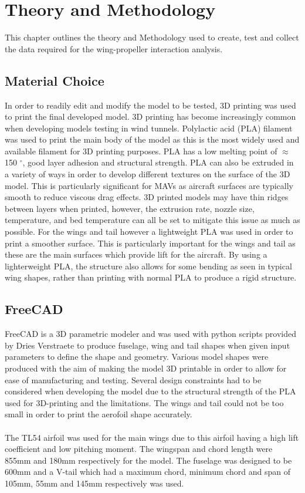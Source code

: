 \graphicspath{{./Figs/}}

\chapter{Theory and Methodology}
This chapter outlines the theory and Methodology used to create, test and collect the data required for the wing-propeller interaction analysis. 
\section{Material Choice}
In order to readily edit and modify the model to be tested, 3D printing was used to print the final developed model. 3D printing has become increasingly common when developing models testing in wind tunnels. Polylactic acid (PLA) filament was used to print the main body of the model as this is the most widely used and available filament for 3D printing purposes. PLA has a low melting point of $\approx$ 150 $^{\circ}$, good layer adhesion and structural strength. PLA can also be extruded in a variety of ways in order to develop different textures on the surface of the 3D model. This is particularly significant for MAVs as aircraft surfaces are typically smooth to reduce viscous drag effects. 3D printed models may have thin ridges between layers when printed, however, the extrusion rate, nozzle size, temperature, and bed temperature can all be set to mitigate this issue as much as possible. For the wings and tail however a lightweight PLA was used in order to print a smoother surface. This is particularly important for the wings and tail as these are the main surfaces which provide lift for the aircraft. By using a lighterweight PLA, the structure also allows for some bending as seen in typical wing shapes, rather than printing with normal PLA to produce a rigid structure.  


\section{FreeCAD}
FreeCAD is a 3D parametric modeler and was used with python scripts provided by Dries Verstraete to produce fuselage, wing and tail shapes when given input parameters to define the shape and geometry. Various model shapes were produced with the aim of making the model 3D printable in order to allow for ease of manufacturing and testing. Several design constraints had to be considered when developing the model due to the structural strength of the PLA used for 3D-printing and the limitations. The wings and tail could not be too small in order to print the aerofoil shape accurately.\\
\\ The TL54 airfoil was used for the main wings due to this airfoil having a high lift coefficient and low pitching moment. The wingspan and chord length were 855mm and 180mm respectively for the model. The fuselage was designed to be 600mm and a V-tail which had a maximum chord, minimum chord and span of 105mm, 55mm and 145mm respectively was used.  

